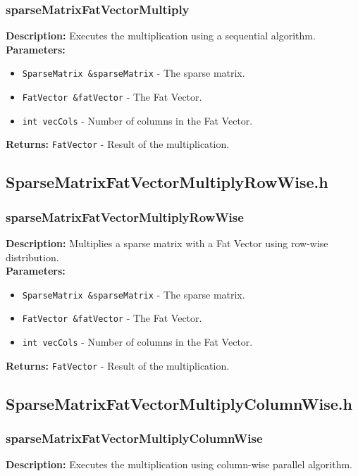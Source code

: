 \documentclass[12pt,oneside]{book} %
\begin{document}
\begin{subappendices}
    \subsubsection{sparseMatrixFatVectorMultiply}
    \textbf{Description:} Executes the multiplication using a sequential algorithm.\\

    \textbf{Parameters:}
    \begin{itemize}
        \item \texttt{SparseMatrix \&sparseMatrix} - The sparse matrix.
        \item \texttt{FatVector \&fatVector} - The Fat Vector.
        \item \texttt{int vecCols} - Number of columns in the Fat Vector.
    \end{itemize}

    \textbf{Returns:} \texttt{FatVector} - Result of the multiplication.

    \subsection{SparseMatrixFatVectorMultiplyRowWise.h}
    \subsubsection{sparseMatrixFatVectorMultiplyRowWise}
    \textbf{Description:} Multiplies a sparse matrix with a Fat Vector using row-wise distribution.\\

    \textbf{Parameters:}
    \begin{itemize}
        \item \texttt{SparseMatrix \&sparseMatrix} - The sparse matrix.
        \item \texttt{FatVector \&fatVector} - The Fat Vector.
        \item \texttt{int vecCols} - Number of columns in the Fat Vector.
    \end{itemize}

    \textbf{Returns:} \texttt{FatVector} - Result of the multiplication.

    \subsection{SparseMatrixFatVectorMultiplyColumnWise.h}
    \subsubsection{sparseMatrixFatVectorMultiplyColumnWise}
    \textbf{Description:} Executes the multiplication using column-wise parallel algorithm.\\


\end{subappendices}
\end{document}
